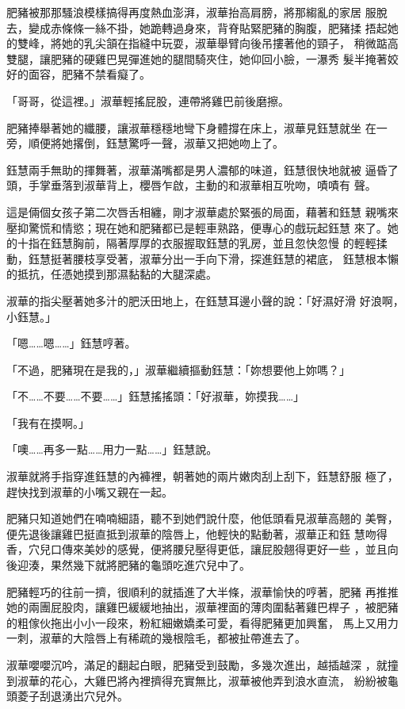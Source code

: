 肥豬被那那騷浪模樣搞得再度熱血澎湃，淑華抬高肩膀，將那縐亂的家居
服脫去，變成赤條條一絲不掛，她跪轉過身來，背脊貼緊肥豬的胸腹，肥豬揉
捂起她的雙峰，將她的乳尖頷在指縫中玩耍，淑華舉臂向後吊摟著他的頸子，
稍微踮高雙腿，讓肥豬的硬雞巴晃彈進她的腿間騎夾住，她仰回小臉，一瀑秀
髮半掩著姣好的面容，肥豬不禁看癡了。

「哥哥，從這裡。」淑華輕搖屁股，連帶將雞巴前後磨擦。

肥豬捧舉著她的纖腰，讓淑華穩穩地彎下身體撐在床上，淑華見鈺慧就坐
在一旁，順便將她撂倒，鈺慧驚呼一聲，淑華又把她吻上了。

鈺慧兩手無助的揮舞著，淑華滿嘴都是男人濃郁的味道，鈺慧很快地就被
逼昏了頭，手掌垂落到淑華背上，櫻唇乍啟，主動的和淑華相互吮吻，嘖嘖有
聲。

這是倆個女孩子第二次唇舌相纏，剛才淑華處於緊張的局面，藉著和鈺慧
親嘴來壓抑驚慌和情慾；現在她和肥豬都已是輕車熟路，便專心的戲玩起鈺慧
來了。她的十指在鈺慧胸前，隔著厚厚的衣服握取鈺慧的乳房，並且忽快忽慢
的輕輕揉動，鈺慧挺著腰枝享受著，淑華分出一手向下滑，探進鈺慧的裙底，
鈺慧根本懶的抵抗，任憑她摸到那濕黏黏的大腿深處。

淑華的指尖壓著她多汁的肥沃田地上，在鈺慧耳邊小聲的說：「好濕好滑
好浪啊，小鈺慧。」

「嗯……嗯……」鈺慧哼著。

「不過，肥豬現在是我的，」淑華繼續摳動鈺慧：「妳想要他上妳嗎？」

「不……不要……不要……」鈺慧搖搖頭：「好淑華，妳摸我……」

「我有在摸啊。」

「噢……再多一點……用力一點……」鈺慧說。

淑華就將手指穿進鈺慧的內褲裡，朝著她的兩片嫩肉刮上刮下，鈺慧舒服
極了，趕快找到淑華的小嘴又親在一起。

肥豬只知道她們在喃喃細語，聽不到她們說什麼，他低頭看見淑華高翹的
美臀，便先退後讓雞巴挺直抵到淑華的陰唇上，他輕快的點動著，淑華正和鈺
慧吻得香，穴兒口傳來美妙的感覺，便將腰兒壓得更低，讓屁股翹得更好一些
，並且向後迎湊，果然幾下就將肥豬的龜頭吃進穴兒中了。

肥豬輕巧的往前一擠，很順利的就插進了大半條，淑華愉快的哼著，肥豬
再推推她的兩團屁股肉，讓雞巴緩緩地抽出，淑華裡面的薄肉圍黏著雞巴桿子
，被肥豬的粗傢伙拖出小小一段來，粉紅細嫩嬌柔可愛，看得肥豬更加興奮，
馬上又用力一刺，淑華的大陰唇上有稀疏的幾根陰毛，都被扯帶進去了。

淑華嚶嚶沉吟，滿足的翻起白眼，肥豬受到鼓勵，多幾次進出，越插越深
，就撞到淑華的花心，大雞巴將內裡擠得充實無比，淑華被他弄到浪水直流，
紛紛被龜頭菱子刮退湧出穴兒外。

